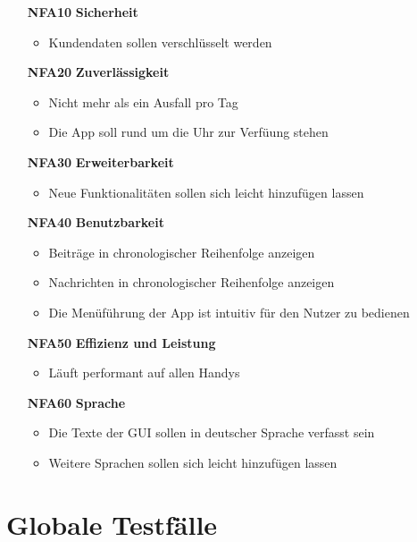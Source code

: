 \documentclass[parskip=full]{scrartcl}
\begin{document}
			\begin{itemize}
				\item[\textbf{NFA10}] \textbf{Sicherheit}
					\begin{itemize}[nosep]
						\item Kundendaten sollen verschlüsselt werden
					\end{itemize}
				\item[\textbf{NFA20}] \textbf{Zuverlässigkeit}
					\begin{itemize}[nosep]
						\item Nicht mehr als ein Ausfall pro Tag
						\item Die App soll rund um die Uhr zur Verfüung stehen
					\end{itemize}
				\item[\textbf{NFA30}] \textbf{Erweiterbarkeit}
					\begin{itemize}[nosep]
						\item Neue Funktionalitäten sollen sich leicht hinzufügen lassen
					\end{itemize}
				\item[\textbf{NFA40}] \textbf{Benutzbarkeit}
					\begin{itemize}[nosep]
						\item Beiträge in chronologischer Reihenfolge anzeigen
						\item Nachrichten in chronologischer Reihenfolge anzeigen
						\item 	Die Menüführung der App ist intuitiv für den Nutzer zu bedienen
					\end{itemize}
				\item[\textbf{NFA50}] \textbf{Effizienz und Leistung}
					\begin{itemize}[nosep]
						\item Läuft performant auf allen Handys
					\end{itemize}
				\item[\textbf{NFA60}] \textbf{Sprache}
					\begin{itemize}[nosep]
						\item Die Texte der GUI sollen in deutscher Sprache verfasst sein
						\item Weitere Sprachen sollen sich leicht hinzufügen lassen
					\end{itemize}
			\end{itemize}	
	\section{Globale Testfälle}
	
\end{document}
